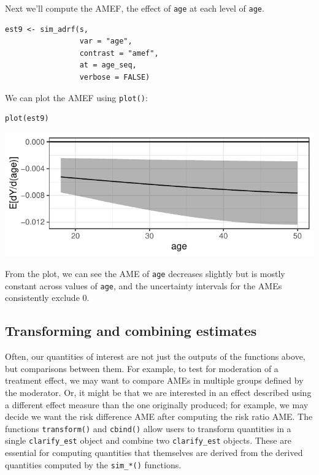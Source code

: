 Next we'll compute the AMEF, the effect of \texttt{age} at each level of \texttt{age}.

\begin{verbatim}
est9 <- sim_adrf(s,
                 var = "age",
                 contrast = "amef",
                 at = age_seq,
                 verbose = FALSE)
\end{verbatim}

We can plot the AMEF using \texttt{plot()}:

\begin{verbatim}
plot(est9)
\end{verbatim}

\begin{center}\includegraphics{figures/unnamed-chunk-28-1} \end{center}

From the plot, we can see the AME of \texttt{age} decreases slightly but is mostly constant across values of \texttt{age}, and the uncertainty intervals for the AMEs consistently exclude 0.

\hypertarget{transforming-and-combining-estimates}{%
\subsection{Transforming and combining estimates}\label{transforming-and-combining-estimates}}

Often, our quantities of interest are not just the outputs of the functions above, but comparisons between them. For example, to test for moderation of a treatment effect, we may want to compare AMEs in multiple groups defined by the moderator. Or, it might be that we are interested in an effect described using a different effect measure than the one originally produced; for example, we may decide we want the risk difference AME after computing the risk ratio AME. The functions \texttt{transform()} and \texttt{cbind()} allow users to transform quantities in a single \texttt{clarify\_est} object and combine two \texttt{clarify\_est} objects. These are essential for computing quantities that themselves are derived from the derived quantities computed by the \texttt{sim\_*()} functions.


